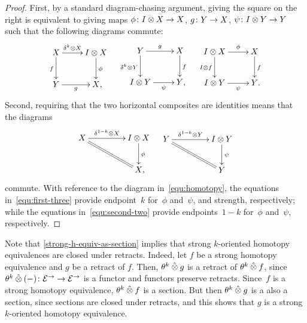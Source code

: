 \documentclass[reqno,10pt,a4paper,oneside,draft]{amsart}
\begin{document}
{{\begin{proof}
First, by a standard diagram-chasing argument, giving the square on the right is equivalent to giving maps $\phi \colon I \otimes X \to X$, $g \colon Y \to X$, $\psi \colon I \otimes Y \to Y$ such that the following diagrams commute:
\begin{align} \label{equ:first-three}
\begin{gathered}
\xymatrix{
  X
  \ar[r]^-{\kcyl \otimes X}
  \ar[d]_f
&
  \interval \otimes X
  \ar[d]^{\phi}
\\
  Y \ar[r]_-{g}
&
  X
\rlap{,}}
\end{gathered}
&&
\begin{gathered}
\xymatrix{
  Y
  \ar[r]^-g
  \ar[d]_{\kcyl \otimes Y}
&
  X
  \ar[d]^f
\\
  \interval \otimes Y
  \ar[r]_-{\psi}
&
  Y
\rlap{,}}
\end{gathered}
&&
\begin{gathered}
\xymatrix{
  \interval \otimes X
  \ar[r]^-\phi
  \ar[d]_{I \otimes f}
&
  X
  \ar[d]^{f}
\\
  \interval \otimes Y
  \ar[r]_-{\psi}
&
  Y
\rlap{.}}
\end{gathered}
\end{align}
Second, requiring that the two horizontal composites are identities means that the diagrams
\begin{align} \label{equ:second-two}
\begin{gathered}
\xymatrix@C+2em{
  X
  \ar[r]^-{\kcylinv \otimes X}
  \ar@{=}[dr]
&
  \interval \otimes X
  \ar[d]^\phi
\\&
  X
\rlap{,}}
\end{gathered}
&&
\begin{gathered}
\xymatrix@C+2em{
  Y
  \ar[r]^-{\kcylinv \otimes Y}
  \ar@{=}[dr]
&
  \interval \otimes Y
  \ar[d]^{\psi}
\\&
  Y
}
\end{gathered}
\end{align}
commute.
With reference to the diagram in~\eqref{equ:homotopy}, the equations in~\eqref{equ:first-three} provide endpoint~$k$ for~$\phi$ and~$\psi$, and strength, respectively; while the equations in~\eqref{equ:second-two} provide endpoints~$1-k$ for~$\phi$ and~$\psi$, respectively.
\end{proof}


Note that \cref{strong-h-equiv-as-section} implies that strong $k$-oriented homotopy equivalences are closed under retracts.
Indeed, let $f$ be a strong homotopy equivalence and $g$ be a retract of $f$. Then, $\theta^k \mathbin{\hat{\otimes}} g$ is a retract of 
$\theta^k \mathbin{\hat{\otimes}} f$, since $\theta^k \mathbin{\hat{\otimes}} (-) \colon \mathcal{E}^\to \to \mathcal{E}^\to$ is a functor and functors preserve retracts.
Since~$f$ is a strong homotopy equivalence, $\theta^k \mathbin{\hat{\otimes}} f$ is a section. But then $\theta^k \mathbin{\hat{\otimes}} g$ is a also
a section, since
sections are closed under retracts, and this shows that $g$ is a strong $k$-oriented homotopy equivalence. 


}}
\end{document}
